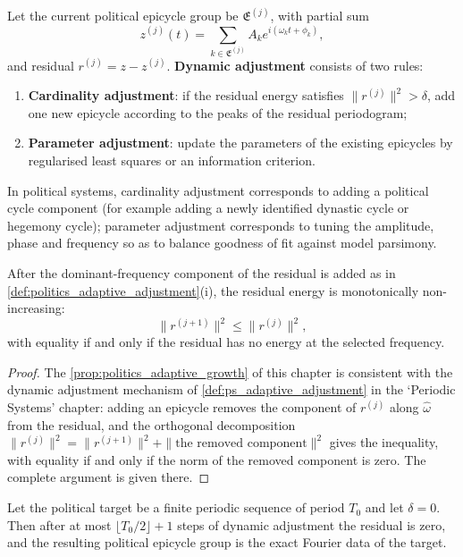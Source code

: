\begin{definition}\label{def:politics_adaptive_adjustment}
Let the current political epicycle group be $\mathfrak E^{(j)}$, with partial sum
\[
z^{(j)}(t)=\sum_{k\in\mathfrak E^{(j)}}A_k e^{i(\omega_k t+\phi_k)},
\]
and residual $r^{(j)}=z-z^{(j)}$. \textbf{Dynamic adjustment} consists of two rules:
\begin{enumerate}[label=(\roman*)]
    \item \textbf{Cardinality adjustment}: if the residual energy satisfies $\|r^{(j)}\|^2>\delta$, add one new epicycle according to the peaks of the residual periodogram;
    \item \textbf{Parameter adjustment}: update the parameters of the existing epicycles by regularised least squares or an information criterion.
\end{enumerate}
In political systems, cardinality adjustment corresponds to adding a political cycle component (for example adding a newly identified dynastic cycle or hegemony cycle); parameter adjustment corresponds to tuning the amplitude, phase and frequency so as to balance goodness of fit against model parsimony.
\end{definition}

\begin{proposition}\label{prop:politics_adaptive_growth}
After the dominant-frequency component of the residual is added as in \cref{def:politics_adaptive_adjustment}(i), the residual energy is monotonically non-increasing:
\[
\|r^{(j+1)}\|^2\le\|r^{(j)}\|^2,
\]
with equality if and only if the residual has no energy at the selected frequency.
\end{proposition}

\begin{proof}
The \cref{prop:politics_adaptive_growth} of this chapter is consistent with the dynamic adjustment mechanism of \cref{def:ps_adaptive_adjustment} in the `Periodic Systems' chapter:
adding an epicycle removes the component of $r^{(j)}$ along $\hat\omega$ from the residual, and the orthogonal decomposition
$\|r^{(j)}\|^2=\|r^{(j+1)}\|^2+\|\text{the removed component}\|^2$ gives the inequality,
with equality if and only if the norm of the removed component is zero. The complete argument is given there.
\end{proof}

\begin{theorem}\label{thm:politics_adaptive_convergence}
Let the political target be a finite periodic sequence of period $T_0$ and let $\delta=0$. Then after at most $\lfloor T_0/2\rfloor+1$ steps of dynamic adjustment the residual is zero, and the resulting political epicycle group is the exact Fourier data of the target.
\end{theorem}

